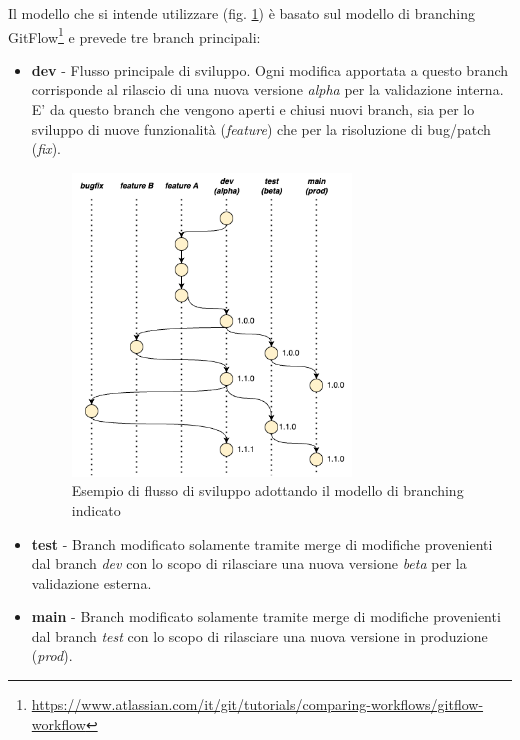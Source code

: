 Il modello che si intende utilizzare (fig. \ref{branching}) è basato sul modello di branching GitFlow\footnote{\href{https://www.atlassian.com/it/git/tutorials/comparing-workflows/gitflow-workflow}{https://www.atlassian.com/it/git/tutorials/comparing-workflows/gitflow-workflow}} e prevede tre branch principali:

\begin{itemize}
    \item \textbf{dev} - Flusso principale di sviluppo. Ogni modifica apportata a questo branch corrisponde al rilascio di una nuova versione \textit{alpha} per la validazione interna. E' da questo branch che vengono aperti e chiusi nuovi branch, sia per lo sviluppo di nuove funzionalità (\textit{feature}) che per la risoluzione di bug/patch (\textit{fix}).

    \begin{figure}[H]
        \centering
        \includegraphics[width=0.7\textwidth]{img/branching-model.png}
        \caption{Esempio di flusso di sviluppo adottando il modello di branching indicato}
        \label{branching}
    \end{figure}
    
    \item \textbf{test} - Branch modificato solamente tramite merge di modifiche provenienti dal branch \textit{dev} con lo scopo di rilasciare una nuova versione \textit{beta} per la validazione esterna.
    \item \textbf{main} - Branch modificato solamente tramite merge di modifiche provenienti dal branch \textit{test} con lo scopo di rilasciare una nuova versione in produzione (\textit{prod}).
\end{itemize}

